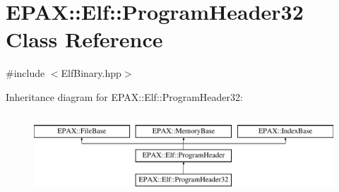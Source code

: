 \hypertarget{class_e_p_a_x_1_1_elf_1_1_program_header32}{\section{\-E\-P\-A\-X\-:\-:\-Elf\-:\-:\-Program\-Header32 \-Class \-Reference}
\label{class_e_p_a_x_1_1_elf_1_1_program_header32}
}


{\ttfamily \#include $<$\-Elf\-Binary.\-hpp$>$}

\-Inheritance diagram for \-E\-P\-A\-X\-:\-:\-Elf\-:\-:\-Program\-Header32\-:\begin{figure}[H]
\begin{center}
\leavevmode
\includegraphics[height=3.000000cm]{class_e_p_a_x_1_1_elf_1_1_program_header32}
\end{center}
\end{figure}
